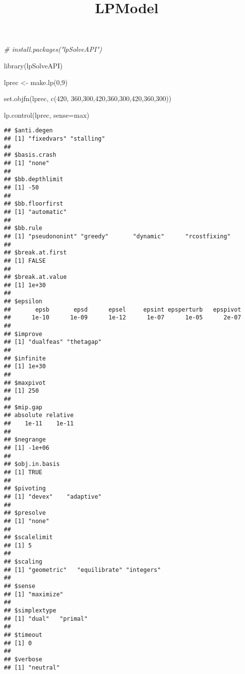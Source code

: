 \documentclass[
]{article}
\title{LPModel}
\author{}
\date{\vspace{-2.5em}}
\newenvironment{Shaded}{\begin{snugshade}}{\end{snugshade}}
\newcommand{\AttributeTok}[1]{\textcolor[rgb]{0.77,0.63,0.00}{#1}}
\newcommand{\CommentTok}[1]{\textcolor[rgb]{0.56,0.35,0.01}{\textit{#1}}}
\newcommand{\DecValTok}[1]{\textcolor[rgb]{0.00,0.00,0.81}{#1}}
\newcommand{\FunctionTok}[1]{\textcolor[rgb]{0.00,0.00,0.00}{#1}}
\newcommand{\NormalTok}[1]{#1}
\newcommand{\OtherTok}[1]{\textcolor[rgb]{0.56,0.35,0.01}{#1}}
\newcommand{\StringTok}[1]{\textcolor[rgb]{0.31,0.60,0.02}{#1}}
\begin{document}
\maketitle

\begin{Shaded}
\begin{Highlighting}[]
\CommentTok{\# install.packages("lpSolveAPI")}
\end{Highlighting}
\end{Shaded}

\begin{Shaded}
\begin{Highlighting}[]
\FunctionTok{library}\NormalTok{(lpSolveAPI)}
\end{Highlighting}
\end{Shaded}

\begin{Shaded}
\begin{Highlighting}[]
\NormalTok{lprec }\OtherTok{\textless{}{-}} \FunctionTok{make.lp}\NormalTok{(}\DecValTok{0}\NormalTok{,}\DecValTok{9}\NormalTok{)}
\end{Highlighting}
\end{Shaded}

\begin{Shaded}
\begin{Highlighting}[]
\FunctionTok{set.objfn}\NormalTok{(lprec, }\FunctionTok{c}\NormalTok{(}\DecValTok{420}\NormalTok{, }\DecValTok{360}\NormalTok{,}\DecValTok{300}\NormalTok{,}\DecValTok{420}\NormalTok{,}\DecValTok{360}\NormalTok{,}\DecValTok{300}\NormalTok{,}\DecValTok{420}\NormalTok{,}\DecValTok{360}\NormalTok{,}\DecValTok{300}\NormalTok{))}
\end{Highlighting}
\end{Shaded}

\begin{Shaded}
\begin{Highlighting}[]
\FunctionTok{lp.control}\NormalTok{(lprec, }\AttributeTok{sense=}\StringTok{\textquotesingle{}max\textquotesingle{}}\NormalTok{)}
\end{Highlighting}
\end{Shaded}

\begin{verbatim}
## $anti.degen
## [1] "fixedvars" "stalling" 
## 
## $basis.crash
## [1] "none"
## 
## $bb.depthlimit
## [1] -50
## 
## $bb.floorfirst
## [1] "automatic"
## 
## $bb.rule
## [1] "pseudononint" "greedy"       "dynamic"      "rcostfixing" 
## 
## $break.at.first
## [1] FALSE
## 
## $break.at.value
## [1] 1e+30
## 
## $epsilon
##       epsb       epsd      epsel     epsint epsperturb   epspivot 
##      1e-10      1e-09      1e-12      1e-07      1e-05      2e-07 
## 
## $improve
## [1] "dualfeas" "thetagap"
## 
## $infinite
## [1] 1e+30
## 
## $maxpivot
## [1] 250
## 
## $mip.gap
## absolute relative 
##    1e-11    1e-11 
## 
## $negrange
## [1] -1e+06
## 
## $obj.in.basis
## [1] TRUE
## 
## $pivoting
## [1] "devex"    "adaptive"
## 
## $presolve
## [1] "none"
## 
## $scalelimit
## [1] 5
## 
## $scaling
## [1] "geometric"   "equilibrate" "integers"   
## 
## $sense
## [1] "maximize"
## 
## $simplextype
## [1] "dual"   "primal"
## 
## $timeout
## [1] 0
## 
## $verbose
## [1] "neutral"
\end{verbatim}
\end{document}

